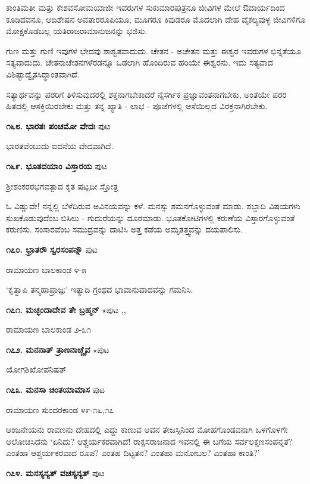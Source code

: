 {ಕಾಂತಿಮತೀ ಮತ್ತು ಕೇಶವಸೋಮಯಾಜೀ ಇವರುಗಳ ಸುಕುಮಾರಪುತ್ರನೂ ಜೀವಿಗಳ ಮೇಲೆ ಔದಾರ್ಯದಿಂದ ಕೂಡಿದವನೂ, ಆದಿಶೇಷನ ಅವತಾರರೂಪಿಯೂ, ಮೂಗರೂ ಕಿವುಡರೂ ಮೊದಲಾಗಿ ದೇಹ ವೈಕಲ್ಯವುಳ್ಳ ಜೀವಿಗಳಿಗೂ ಮೋಕ್ಷಕೊಡಬಲ್ಲ ಯತಿರಾಜರಾಮಾನುಜನನ್ನು ಭಜಿಸು.

ಗುಣ ಮತ್ತು ಗುಣಿ ಇವುಗಳ ಭೇದವು ಶಾಶ್ವತವಾದುದು. ಚೇತನ - ಅಚೇತನ ಮತ್ತು ಈಶ್ವರ ಇವರುಗಳ ಭಿನ್ನತೆಯೂ ಸತ್ಯವಾದುದು. ಚೇತನಾಚೇತನಗಳೆರಡನ್ನೂ ಒಡಲಾಗಿ ಹೊಂದಿರುವ ಹರಿಯೇ ಈಶ್ವರನು. ಇದು ಸತ್ಯವಾದ ವಿಶಿಷ್ಟಾದ್ವೈತಸಿದ್ಧಾಂತವಾಗಿದೆ.

ಸತ್ಯಾರ್ಥವನ್ನು ಪರರಿಗೆ ತಿಳಿಸುವುದರಲ್ಲಿ ಶಕ್ತನಾಗಬೇಕಾದರೆ ನೈಸರ್ಗಿಕ ಪ್ರಜ್ಞಾವಂತನಾಗಬೇಕು, ಅಂತೆಯೇ ಪರರ ಹಿತದಲ್ಲಿ ಆಸಕ್ತಿಯಿರಬೇಕು ಮತ್ತು ತನ್ನ ಖ್ಯಾತಿ - ಲಾಭ - ಪೂಜೆಗಳಲ್ಲಿ ಆಸೆಯಿಲ್ಲದ ವಿರಕ್ತನಾಗಿರಬೇಕು.

\medskip
\noindent\textbf{೧೬೮. ಭಾರತಃ ಪಂಚಮೋ ವೇದಃ} \hfill ಪುಟ \pageref{122}

ಭಾರತವೆಂಬುದು ಐದನೆಯ ವೇದವಾಗಿದೆ.

\medskip
\noindent\textbf{೧೬೯. ಭೂತದಯಾಂ ವಿಸ್ತಾರಯ} \hfill ಪುಟ \pageref{115}

\hfill ಶ್ರೀಶಂಕರರಭಗವತ್ಪಾದ ಕೃತ ಷಟ್ಪದೀ ಸ್ತೋತ್ರ

ಓ ವಿಷ್ಣುವೇ! ನನ್ನಲ್ಲಿ ಬೆಳೆದಿರುವ ಅವಿನಯವನ್ನು ಕಳೆ. ಮನಸ್ಸು ಶಮನಗೊಳ್ಳುವಂತೆ ಮಾಡು. ಶಬ್ದಾದಿ ವಿಷಯಗಳು ಸುಖಕೊಡುವುದೆಂಬ ಬಿಸಿಲು - ಗುದುರೆಯನ್ನು ದೂರಮಾಡು. ಭೂತಕೋಟಿಗಳಲ್ಲಿ ಕರುಣೆಯ ವಿಸ್ತಾರಗೊಳ್ಳುವಂತೆ ಕರುಣಿಸು. ಸಂಸಾರವೆಂಬ ಸಮುದ್ರವನ್ನು ದಾಟಿಸಿ ಅತ್ತ ಕಡೆಯ ಅಮೃತತ್ತ್ವವನ್ನು ದಯಪಾಲಿಸು.

\medskip
\noindent\textbf{೧೭೦. ಭ್ರಾತರೌ ಸ್ವರಸಂಪನ್ನೌ} \hfill ಪುಟ \pageref{250}

\hfill ರಾಮಾಯಣ ಬಾಲಕಾಂಡ ೪-೫

`ಕೃತ್ವಾಪಿ ತನ್ಮಹಾಪ್ರಾಜ್ಞಃ' ಇತ್ಯಾದಿ ಗ್ರಂಥದ ಭಾವಾನುವಾದವನ್ನು ಗಮನಿಸಿ.

\medskip
\noindent\textbf{೧೭೧. ಮಚ್ಛಂದಾದೇವ ತೇ ಬ್ರಹ್ಮನ್} $\star$\hfill ಪುಟ \pageref{21},\pageref{203},\pageref{250}

\hfill ರಾಮಾಯಣ ಬಾಲಕಾಂಡ ೨-೩೧


\medskip
\noindent\textbf{೧೭೨. ಮನನಾತ್ ತ್ರಾಣನಾಚ್ಚೈವ} $\star$\hfill ಪುಟ \pageref{10}

\hfill ಯೋಗಶಿಖೋಪನಿಷತ್

\medskip
\noindent\textbf{೧೭೩. ಮನಸಾ ಚಿಂತಯಾಮಾಸ} \hfill ಪುಟ \pageref{192}

\hfill ರಾಮಾಯಣ ಸುಂದರಕಾಂಡ ೪೯-೧೬,೧೭

ಆಂಜನೇಯನು ರಾವಣನು ದೇಹದಲ್ಲಿ ಎದ್ದು ಕಾಣುವ ಆವನ ತೇಜಸ್ಸಿನಿಂದ ಮೋಹಗೊಂಡವನಾಗಿ ಒಳಗೊಳಗೇ ಆಲೋಚಿಸಿದನು `ಏನಿದು? ಆಶ್ಚರ್ಯಕರವಾಗಿದೆ! ರಾಕ್ಷಸರಾಜನಾದ ಇವನಲ್ಲಿ ಈ ಬಗೆಯ ಸರ್ವಲಕ್ಷಣಸಂಪನ್ನತೆ? ಎಂತಹಾ ಆಶ್ಚರ್ಯಕರವಾದ ರೂಪ? ಎಂತಹ ದಿಟ್ಟತನ? ಎಂತಹಾ ಮನೋಬಲ? ಎಂತಹಾ ಕಾಂತಿ?'

\medskip
\noindent\textbf{೧೭೪. ಮನಸ್ಯನ್ಯತ್ ವಚಸ್ಯನ್ಯತ್} \hfill ಪುಟ \pageref{102}

}
